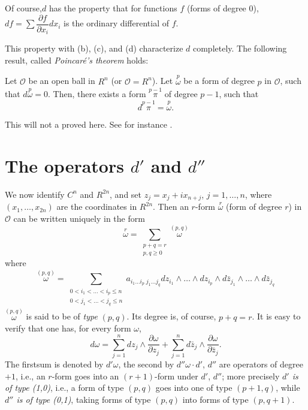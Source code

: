 Of course,\pageoriginale $d$ has the property that for functions $f$
(forms of degree $0$), $df = \sum \dfrac{\partial f}{\partial x_i}
dx_i$ is the ordinary differential of $f$. 

This property with (b), (c), and (d) characterize $d$ completely. The
following result, called \textit{Poincar\'e's theorem} holds:

Let $\mathscr{O}$ be an open ball in $R^n$ (or $\mathscr{O} =
R^n$). Let $\overset{p}{\omega}$ be a form of degree $p$ in
$\mathscr{O}$, such that $d \overset{p}{\omega} = 0$. Then, there
exists a form $\overset{p-1}{\pi}$ of degree $p-1$, such that 
$$
d \overset{p-1}{\pi} = \overset{p}{\omega}. 
$$

This will not a proved here. See for instance \cite{p2:key6}.


\section{The operators \texorpdfstring{$d'$}{d'} and \texorpdfstring{$d''$}{d''}}\label{chap8:sec2}

We now identify $C^n$ and $R^{2n}$, and set $z_j = x_j + i x_{n+j}$,
$j=1, \ldots, n$, where $(x_1, \ldots, x_{2n})$ are the coordinates in
$R^{2n}$. Then an $r$-form $\overset{r}{\omega}$ (form of degree $r$)
in $\mathscr{O}$ can be written uniquely in the form 
$$
\overset{r}{\omega} = \sum\limits_{\substack{p+q=r\\p,q \geq 0}}
\overset{(p,q)}{\omega} 
$$
where 
$$
\overset{(p,q)}{\omega} =\sum\limits_{\substack{0<i_1 < \ldots < i_p
    \leq n\\0<j_1<\ldots < j_q \leq n}} a_{i_1 \ldots i_p \; j_1
  \ldots j_q} dz_{i_1} \wedge \ldots \wedge dz_{i_p} \wedge
d\bar{z}_{j_1} \wedge \ldots \wedge d \bar{z}_{j_q} 
$$
$\overset{(p,q)}{\omega}$ is said to be of \textit{type} $(p,q)$. Its
degree is, of course, $p+q =r$. It is easy to verify that one has, for
every form $\omega$, 
$$
d\omega = \sum\limits^n_{j=1} dz_j \wedge \frac{\partial
  \omega}{\partial z_j} + \sum\limits^n_{j=1} d \bar{z}_j \wedge
\frac{\partial \omega}{\partial\bar{z}_j} .
$$
The first\pageoriginale sum is denoted by $d'\omega$, the second by
$d''\omega \cdot d'$, $d''$ are operators of degree $+1$, i.e., an
$r$-form goes into an $(r+1)$-form under $d'$, $d''$;  more precisely
\textit{$d'$ is of type (1,0)}, i.e., a form of type $(p,q)$ goes into
one of type $(p+1, q)$, while \textit{$d''$ is of type (0,1)},
taking forms of type $(p,q)$ into forms of type $(p, q+1)$.

